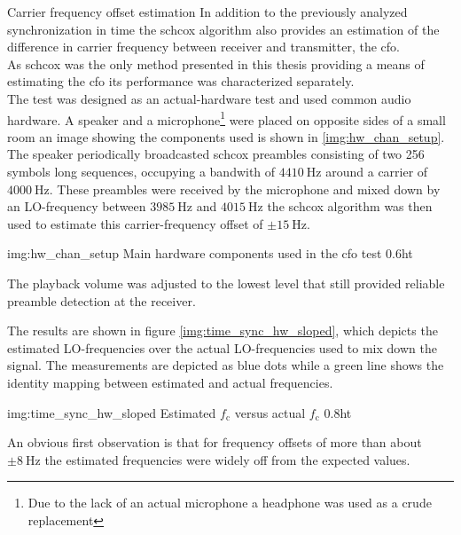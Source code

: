 \begin{subchapter}{Carrier frequency offset estimation}
  In addition to the previously analyzed synchronization in time
  the \gls{schcox} algorithm also provides an estimation of
  the difference in carrier frequency between receiver and
  transmitter, the \acrfull{cfo}. \\

  As \gls{schcox} was the only method presented in this thesis
  providing a means of estimating the \gls{cfo}
  its performance was characterized separately. \\

  The test was designed as an actual-hardware test
  and used common audio hardware.
  A speaker and a microphone\footnote{Due to the lack of an actual
  microphone a headphone was used as a crude replacement}
  were placed on opposite
  sides of a small room an image showing the components used
  is shown in \autoref{img:hw_chan_setup}. The speaker periodically broadcasted
  \gls{schcox} preambles consisting of two 256 symbols long
  sequences, occupying a bandwith of $\SI{4410}{\hertz}$
  around a carrier of $\SI{4000}{\hertz}$.
  These preambles were received by the microphone and mixed
  down by an LO-frequency between $\SI{3985}{\hertz}$ and $\SI{4015}{\hertz}$
  the \gls{schcox} algorithm was then used to estimate
  this carrier-frequency offset of $\pm\SI{15}{\hertz}$.

                  {img:hw_chan_setup}
                  {Main hardware components used in the \acrshort{cfo} test}
                  {0.6}{ht}

  The playback volume was adjusted to the lowest level
  that still provided reliable preamble detection at the receiver.

  The results are shown in figure \ref{img:time_sync_hw_sloped},
  which depicts the estimated LO-frequencies over the
  actual LO-frequencies used to mix down the signal.
  The measurements are depicted as blue dots while a
  green line shows the identity mapping between estimated
  and actual frequencies.

                  {img:time_sync_hw_sloped}
                  {Estimated $f_\text{c}$ versus actual $f_\text{c}$}
                  {0.8}{ht}

  An obvious first observation is that for frequency offsets of
  more than about $\pm\SI{8}{\hertz}$ the estimated frequencies
  were widely off from the expected values.


\end{subchapter}
